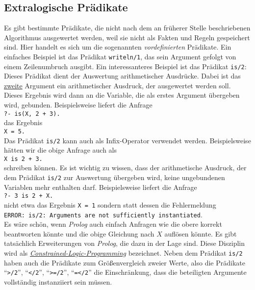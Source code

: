 \subsection{Extralogische Pr\"{a}dikate}
Es gibt bestimmte Pr\"{a}dikate, die nicht nach dem an fr\"{u}herer Stelle beschriebenen Algorithmus
ausgewertet werden, weil sie nicht als Fakten und Regeln gespeichert sind.  Hier handelt es sich um
die sogenannten \emph{vordefinierten} Pr\"{a}dikate.  Ein einfaches Beispiel ist das Pr\"{a}dikat
\texttt{writeln/1}, das sein Argument gefolgt von einem Zeilenumbruch ausgibt.  Ein interessanteres
Beispiel ist das Pr\"{a}dikat \texttt{is/2}: Dieses Pr\"{a}dikat dient der Auswertung arithmetischer
Ausdr\"{u}cke.  Dabei ist das \underline{zweite} Argument ein arithmetischer Ausdruck, der ausgewertet
werden soll.  Dieses Ergebnis wird dann an die Variable, die als erstes Argument \"{u}bergeben wird,
gebunden.  Beispielsweise liefert die Anfrage
\\[0.2cm]
\hspace*{1.3cm}
\texttt{?- is(X, 2 + 3).}
\\[0.2cm]
das Ergebnis
\\[0.2cm]
\hspace*{1.3cm}
\texttt{X = 5.}
\\[0.2cm]
Das Pr\"{a}dikat \texttt{is/2} kann auch als Infix-Operator verwendet werden.  Beispielsweise h\"{a}tten wir
die obige Anfrage auch als
\\[0.2cm]
\hspace*{1.3cm}
\texttt{X is 2 + 3.}
\\[0.2cm]
schreiben k\"{o}nnen.  Es ist wichtig zu wissen, dass der arithmetische Ausdruck, der dem Pr\"{a}dikat
\texttt{is/2} zur Auswertung \"{u}bergeben wird, keine ungebundenen Variablen mehr enthalten darf.
Beispielsweise liefert die Anfrage
\\[0.2cm]
\hspace*{1.3cm}
\texttt{?- 3 is 2 + X.}
\\[0.2cm]
nicht etwa das Ergebnis \texttt{X = 1} sondern statt dessen die Fehlermeldung
\\[0.2cm]
\hspace*{1.3cm}
\texttt{ERROR: is/2: Arguments are not sufficiently instantiated}.
\\[0.2cm]
Es w\"{a}re sch\"{o}n, wenn \textsl{Prolog} auch einfach Anfragen wie die obere korrekt beantworten k\"{o}nnte
und die obige Gleichung nach $X$ aufl\"{o}sen k\"{o}nnte.  Es gibt tats\"{a}chlich Erweiterungen von
\textsl{Prolog}, die dazu in der Lage sind.  Diese Disziplin wird als
\href{http://en.wikipedia.org/wiki/Constraint_logic_programming}{\emph{Constrained-Logic-Programming}} bezeichnet.
Neben dem Pr\"{a}dikat \texttt{is/2} haben auch die Pr\"{a}dikate zum Gr\"{o}ßenvergleich zweier Werte, also die
Pr\"{a}dikate ``\texttt{>/2}'', ``\texttt{</2}'', ``\texttt{>=/2}'', ``\texttt{=</2}'' die
Einschr\"{a}nkung, dass die beteiligten Argumente vollst\"{a}ndig instanziiert sein m\"{u}ssen.

